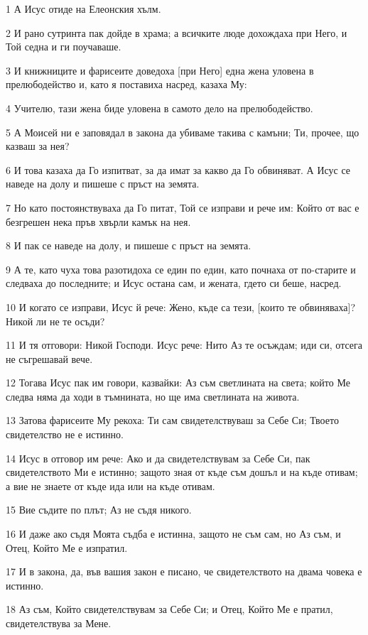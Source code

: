 \par 1 А Исус отиде на Елеонския хълм.
\par 2 И рано сутринта пак дойде в храма; а всичките люде дохождаха при Него, и Той седна и ги поучаваше.
\par 3 И книжниците и фарисеите доведоха [при Него] една жена уловена в прелюбодейство и, като я поставиха насред, казаха Му:
\par 4 Учителю, тази жена биде уловена в самото дело на прелюбодейство.
\par 5 А Моисей ни е заповядал в закона да убиваме такива с камъни; Ти, прочее, що казваш за нея?
\par 6 И това казаха да Го изпитват, за да имат за какво да Го обвиняват. А Исус се наведе на долу и пишеше с пръст на земята.
\par 7 Но като постоянствуваха да Го питат, Той се изправи и рече им: Който от вас е безгрешен нека пръв хвърли камък на нея.
\par 8 И пак се наведе на долу, и пишеше с пръст на земята.
\par 9 А те, като чуха това разотидоха се един по един, като почнаха от по-старите и следваха до последните; и Исус остана сам, и жената, гдето си беше, насред.
\par 10 И когато се изправи, Исус й рече: Жено, къде са тези, [които те обвиняваха]? Никой ли не те осъди?
\par 11 И тя отговори: Никой Господи. Исус рече: Нито Аз те осъждам; иди си, отсега не съгрешавай вече.
\par 12 Тогава Исус пак им говори, казвайки: Аз съм светлината на света; който Ме следва няма да ходи в тъмнината, но ще има светлината на живота.
\par 13 Затова фарисеите Му рекоха: Ти сам свидетелствуваш за Себе Си; Твоето свидетелство не е истинно.
\par 14 Исус в отговор им рече: Ако и да свидетелствувам за Себе Си, пак свидетелството Ми е истинно; защото зная от къде съм дошъл и на къде отивам; а вие не знаете от къде ида или на къде отивам.
\par 15 Вие съдите по плът; Аз не съдя никого.
\par 16 И даже ако съдя Моята съдба е истинна, защото не съм сам, но Аз съм, и Отец, Който Ме е изпратил.
\par 17 И в закона, да, във вашия закон е писано, че свидетелството на двама човека е истинно.
\par 18 Аз съм, Който свидетелствувам за Себе Си; и Отец, Който Ме е пратил, свидетелствува за Мене.
